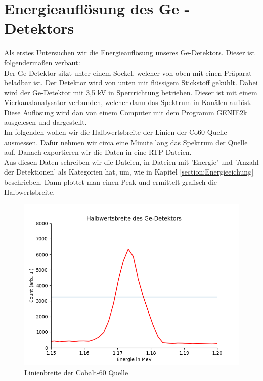 \section{Energieauflösung des Ge - Detektors}

Als erstes Untersuchen wir die Energieauflösung unseres Ge-Detektors. Dieser ist folgendermaßen verbaut:\\
Der Ge-Detektor sitzt unter einem Sockel, welcher von oben mit einen Präparat beladbar ist. Der Detektor wird von unten mit flüssigem 
Stickstoff gekühlt. Dabei wird der Ge-Detektor mit 3,5 kV in Sperrrichtung betrieben. Dieser ist mit einem Vierkanalanalysator verbunden, welcher dann das 
Spektrum in Kanälen auflöst. Diese Auflösung wird dan von einem Computer mit dem Programm GENIE2k ausgelesen und dargestellt.\\
Im folgenden wollen wir die Halbwertsbreite der Linien der Co60-Quelle ausmessen. Dafür nehmen wir circa eine Minute lang das Spektrum der Quelle auf. Danach exportieren wir die Daten in eine RTP-Dateien.\\

Aus diesen Daten schreiben wir die Dateien, in Dateien mit 'Energie' und 'Anzahl der Detektionen' als Kategorien hat, um, wie in Kapitel 
\ref{section:Energieeichung} beschrieben. Dann plottet man einen Peak und ermittelt grafisch die Halbwertsbreite.

\begin{figure}[ht]
    \centering
    \includegraphics[width = \linewidth]{Bilder/Auswertung/Halbwertsbreite.png}
    \caption{Linienbreite der Cobalt-60 Quelle}
\end{figure}

